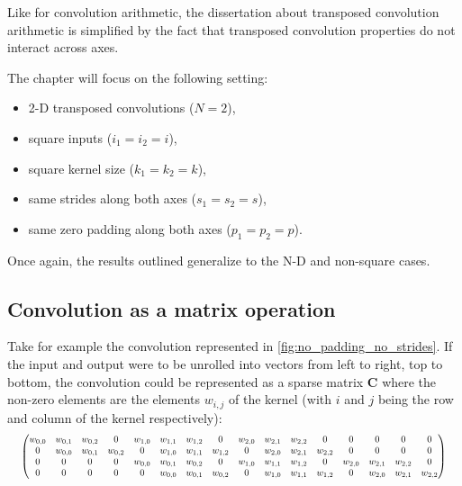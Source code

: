 Like for convolution arithmetic, the dissertation about transposed convolution
arithmetic is simplified by the fact that transposed convolution properties
do not interact across axes.

The chapter will focus on the following setting:

\begin{itemize}
    \item 2-D transposed convolutions ($N = 2$),
    \item square inputs ($i_1 = i_2 = i$),
    \item square kernel size ($k_1 = k_2 = k$),
    \item same strides along both axes ($s_1 = s_2 = s$),
    \item same zero padding along both axes ($p_1 = p_2 = p$).
\end{itemize}

\noindent Once again, the results outlined generalize to the N-D and non-square
cases.

\subsection{Convolution as a matrix operation}

Take for example the convolution represented in
\autoref{fig:no_padding_no_strides}. If the input and output were to be unrolled
into vectors from left to right, top to bottom, the convolution could be
represented as a sparse matrix $\mathbf{C}$ where the non-zero elements are the
elements $w_{i,j}$ of the kernel (with $i$ and $j$ being the row and column of
the kernel respectively):
\begin{equation*}
\setcounter{MaxMatrixCols}{20}
\resizebox{.98\hsize}{!}{$%
    \begin{pmatrix}%
    w_{0,0} & w_{0,1} & w_{0,2} & 0       & w_{1,0} & w_{1,1} & w_{1,2} & 0       &
    w_{2,0} & w_{2,1} & w_{2,2} & 0       & 0       & 0       & 0       & 0       \\
    0       & w_{0,0} & w_{0,1} & w_{0,2} & 0       & w_{1,0} & w_{1,1} & w_{1,2} &
    0       & w_{2,0} & w_{2,1} & w_{2,2} & 0       & 0       & 0       & 0       \\
    0       & 0       & 0       & 0       & w_{0,0} & w_{0,1} & w_{0,2} & 0       &
    w_{1,0} & w_{1,1} & w_{1,2} & 0       & w_{2,0} & w_{2,1} & w_{2,2} & 0       \\
    0       & 0       & 0       & 0       & 0       & w_{0,0} & w_{0,1} & w_{0,2} &
    0       & w_{1,0} & w_{1,1} & w_{1,2} & 0       & w_{2,0} & w_{2,1} & w_{2,2} \\
    \end{pmatrix}$}
\end{equation*}

